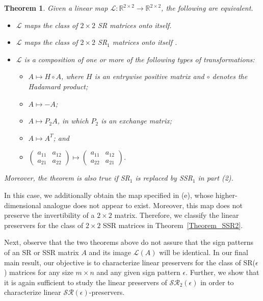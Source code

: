 \documentclass[11pt,reqno]{amsart}
\theoremstyle{plain}
\newtheorem{utheorem}{\textrm{\textbf{Theorem}}}
\theoremstyle{definition}
\numberwithin{equation}{section}
\begin{document}
\begin{utheorem}\label{thrmSR_1}
	Given a linear map $\mathcal{L}:\mathbb{R}^{2\times2}\to\mathbb{R}^{2\times 2}$, the following are equivalent.
	\begin{itemize}
		\item[(1)] $\mathcal{L}$ maps the class of $2\times 2$ SR matrices onto itself.
		\item[(2)] $\mathcal{L}$ maps the class of $2\times 2$ SR$_1$ matrices onto itself .
		\item[(3)] $\mathcal{L}$ is a composition of one or more of the following types of transformations:
		\begin{itemize}
			\item[(a)] $A\mapsto H\circ A$, where $H$ is an entrywise positive matrix and $\circ$ denotes the Hadamard product;
			\item[(b)] $A\mapsto -A$;
			\item[(c)] $A\mapsto P_2A$, in which $P_2$ is an exchange matrix;
			\item[(d)] $A\mapsto A^T$; and
			\item[(e)] $\begin{pmatrix}
				a_{11} & a_{12} \\
				a_{21} & a_{22}
			\end{pmatrix}\mapsto\begin{pmatrix}
				a_{11} & a_{12} \\
				a_{22} & a_{21}
			\end{pmatrix}$.
		\end{itemize}
	\end{itemize}
	Moreover, the theorem is also true if SR$_1$ is replaced by SSR$_1$ in part (2).
\end{utheorem}

In this case, we additionally obtain the map specified in (e), whose higher-dimensional analogue does not appear to exist. Moreover, this map does not preserve the invertibility of a $2\times2$ matrix. Therefore, we classify the linear preservers for the class of $2\times2$ SSR matrices in Theorem~\ref{Theorem_SSR2}.
	
Next, observe that the two theorems above do not assure that the sign patterns of an SR or SSR matrix $A$ and its image $\mathcal{L}(A)$ will be identical. In our final main result, our objective is to characterize linear preservers for the class of SR($\epsilon$) matrices for any size $m \times n$ and any given sign pattern $\epsilon$. Further, we show that it is again sufficient to study the linear preservers of $\mathcal{SR}_2(\epsilon)$  in order to characterize linear $\mathcal{SR}(\epsilon)$-preservers.
\end{document}
